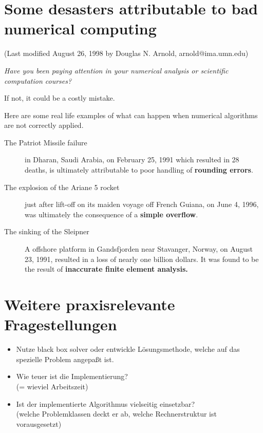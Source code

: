 \documentclass[ngerman,fontsize=11pt, paper=a4, parskip=half, titlepage=true, toc=bib]{scrbook}
\begin{document}
    	
    	\section*{Some desasters attributable to bad numerical computing}
    	
    	{\small	(Last modified August 26, 1998 by Douglas N. Arnold,
    	arnold@ima.umn.edu)}
    	
    	\bigskip
    	{\itshape Have you been paying attention in your numerical analysis or
    	scientific computation courses? 
    	
    	If not, it could be a costly
    	mistake. 
    	
    	Here are some real life examples of what can happen when
    	numerical algorithms are not correctly applied.}
    	
    	\begin{description}
    		\item[The Patriot Missile failure] in Dharan, Saudi Arabia, on
    		February 25, 1991 which resulted in 28 deaths, is ultimately
    		attributable to poor handling of \textbf{rounding errors}. 
    		
    		\item[The explosion of the Ariane 5 rocket] just after lift-off on its
    		maiden voyage off French Guiana, on June 4, 1996, was ultimately the
    		consequence of a \textbf{simple overflow}. 
    		
    		\item[The sinking of the Sleipner] A offshore platform in Gandsfjorden near
    		Stavanger, Norway, on August 23, 1991, resulted in a loss of nearly
    		one billion dollars. It was found to be the result of
    		\textbf{inaccurate finite element analysis.} 
    	\end{description}
    	
    	\section*{Weitere praxisrelevante Fragestellungen}
    	    \begin{itemize}
    	    	\item Nutze black box solver oder entwickle Lösungsmethode,
    	    	welche auf das spezielle Problem angepaßt ist.
    	    	\item Wie teuer ist die Implementierung? \\(= wieviel Arbeitszeit)
    	    	\item Ist der implementierte Algorithmus vielseitig einsetzbar?\\
    	    	(welche Problemklassen deckt er ab, welche Rechnerstruktur ist
    	    	vorausgesetzt)
    	    \end{itemize}
    	    
\end{document}
